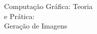 \documentclass[preview]{standalone}
\begin{document}
Computação Gráfica: Teoria\\e Prática:\\Geração de Imagens\\
\end{document}
